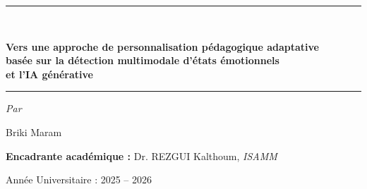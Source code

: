 \begin{titlepage}
\vspace{1.3cm}

\rule{\textwidth}{1.7pt}\\[0.55cm]
{\large\bfseries\color{titrebleu}%
Vers une approche de personnalisation pédagogique adaptative\\[0.25cm]
basée sur la détection multimodale d'états émotionnels\\[0.25cm]
et l'IA générative\par}
\vspace{0.5cm}
\rule{\textwidth}{1.5pt}

\vspace{1.4cm}

{\large \textit{Par}\par}
\vspace{0.3cm}
{\Large Briki Maram\par}

\vspace{1.15cm}

{\normalsize \textbf{Encadrante académique :} Dr. REZGUI Kalthoum, \textit{ISAMM}\par}

\vfill

{\normalsize Année Universitaire : 2025 -- 2026\par}

\restoregeometry
\end{titlepage}

